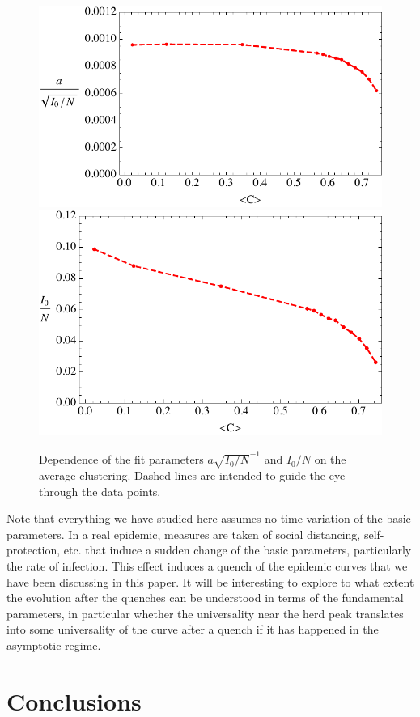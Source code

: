 \documentclass[a4paper,oneside,11pt]{article}
\begin{document}
\begin{figure}[htbp]
\centering
 \hspace{-1.5cm}
 \includegraphics[width=.85\linewidth]{CdepAA.pdf}\\ \includegraphics[width=.75\linewidth]{CdepbAA.pdf}
\caption{Dependence of the fit parameters $a \sqrt{I_0/N}^{-1}$ and $I_0/N$ on the average clustering. Dashed lines are intended to guide the eye through the data points.}
\label{fig:aovI0}
\end{figure}

Note that everything we have studied here assumes no time variation of the basic parameters. In a real epidemic, measures are taken of social distancing, self-protection, etc. that induce a sudden change of the basic parameters, particularly the rate of infection. This effect induces a quench
of the epidemic curves that we have been discussing in this paper. It will be interesting to explore to what extent the evolution after the quenches can be understood in terms of the fundamental parameters, in particular whether the universality near the herd peak translates into some universality of the curve after a quench if it has happened in the asymptotic regime. 

\section{Conclusions}
\label{sec:conclu}
\end{document}
